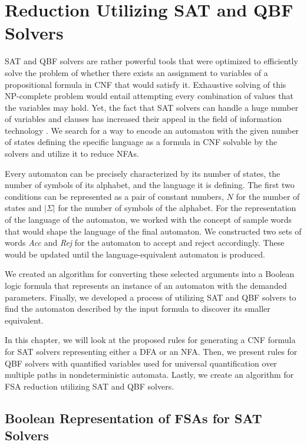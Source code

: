 \chapter{Reduction Utilizing SAT and QBF Solvers}
\label{chap:sat_qbf}

SAT and QBF solvers are rather powerful tools that were optimized to efficiently solve the problem of whether there exists an assignment to variables of a propositional formula in CNF that would satisfy it. Exhaustive solving of this NP-complete problem would entail attempting every combination of values that the variables may hold. Yet, the fact that SAT solvers can handle a huge number of variables and clauses has increased their appeal in the field of information technology \cite{GaneshV20, Masina2023}. We search for a way to encode an automaton with the given number of states defining the specific language as a formula in CNF solvable by the solvers and utilize it to reduce NFAs.

Every automaton can be precisely characterized by its number of states, the number of symbols of its alphabet, and the language it is defining. The first two conditions can be represented as a pair of constant numbers, $N$ for the number of states and $|\Sigma|$ for the number of symbols of the alphabet. For the representation of the language of the automaton, we worked with the concept of sample words that would shape the language of the final automaton. We constructed two sets of words \textit{Acc} and \textit{Rej} for the automaton to accept and reject accordingly. These would be updated until the language-equivalent automaton is produced. 

 We created an algorithm for converting these selected arguments into a Boolean logic formula that represents an instance of an automaton with the demanded parameters. Finally, we developed a process of utilizing SAT and QBF solvers to find the automaton described by the input formula to discover its smaller equivalent.

In this chapter, we will look at the proposed rules for generating a CNF formula for SAT solvers representing either a DFA or an NFA. Then, we present rules for QBF solvers with quantified variables used for universal quantification over multiple paths in nondeterministic automata. Lastly, we create an algorithm for FSA reduction utilizing SAT and QBF solvers.

\section{Boolean Representation of FSAs for SAT Solvers}

